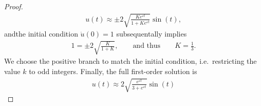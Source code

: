 \documentclass{article} %
\theoremstyle{plain}
\newcommand{\E}{\varepsilon}
\numberwithin{equation}{section} %
\numberwithin{figure}{section} %
\numberwithin{table}{section} %
\begin{document}
\begin{proof}
\begin{align*}
        u(t) \approx \pm 2\sqrt{\frac{Ke^{\E t}}{1 + Ke^{\E t}}}\sin(t),
    \end{align*}
    andthe initial condition $\dot{u}(0) = 1$ subsequentally implies
    \begin{align*}
        1 = \pm2 \sqrt{\frac{K}{1 + K}}, \qquad \text{and thus} \qquad K = \frac{1}{3}.
    \end{align*}
    We choose the positive branch to match the initial condition, i.e.~restricting the value $k$ to odd integers.  Finally, the full first-order solution is
    \begin{align*}
        \boxed{u(t) \approx 2\sqrt{\frac{e^{\E t}}{3 + e^{\E t}}}\sin(t)}
    \end{align*}
\end{proof}
    
\end{document}
